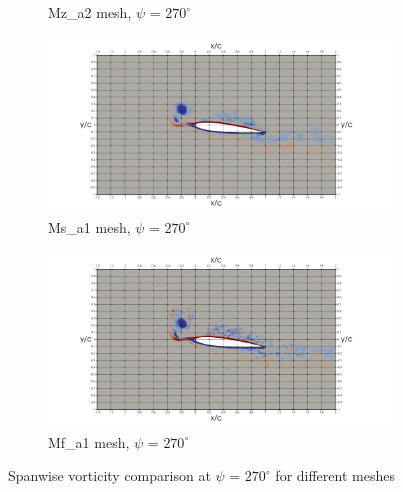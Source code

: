 \begin{figure}[H]
\begin{subfigure}[b]{0.475\textwidth}
\caption{Mz\_a2 mesh, $\psi$ = $270^\circ$}
\label{fig:Ma2_psi270}
\end{subfigure}
\begin{subfigure}[b]{0.475\textwidth}
\centering
\includegraphics[width=1.25\textwidth]{figures/vorticity_plots/SB/ph_270.png}
\caption{Ms\_a1 mesh, $\psi$ = $270^\circ$}
\label{fig:hadapt_psi270}
\end{subfigure}
\begin{subfigure}[b]{0.475\textwidth}
\centering
\includegraphics[width=1.25\textwidth]{figures/vorticity_plots/FB/ph_270.png}
\caption{Mf\_a1 mesh, $\psi$ = $270^\circ$}
\label{fig:FB_psi270}
\end{subfigure}
\caption{Spanwise vorticity comparison at $\psi$ = $270^\circ$ for different meshes}
\label{fig:vorticity_270}
\end{figure}

